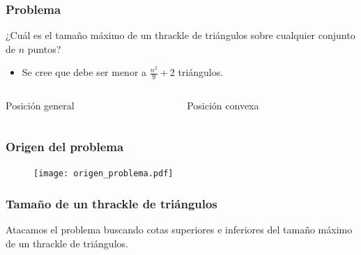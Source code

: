 \documentclass{beamer}
\begin{document}
\begin{frame}
  \frametitle{Problema}
  \begin{block}{}
    ¿Cuál es el tamaño máximo de un thrackle de triángulos sobre
    cualquier conjunto de $n$ puntos?
    \begin{itemize}
      \item Se cree que debe ser menor a $\frac{n^2}{9}+2$ triángulos.
    \end{itemize}
  \end{block}
  \begin{columns}
    \begin{column}{0.5\textwidth}
      \begin{center}
        \begin{figure}[htb]
          \centering
          \def\svgwidth{4.5cm}
          
        \end{figure}
      Posición general
      \end{center}
    \end{column}
    \begin{column}{0.5\textwidth}
      \begin{center}
      \begin{figure}[htb]
        \centering
        \def\svgwidth{4.5cm}
        
      \end{figure}
      Posición convexa
      \end{center}
    \end{column}
  \end{columns}
\end{frame}

\begin{frame}
  \frametitle{Origen del problema}
  \begin{figure}[htb]
    \texttt{[image: origen\_problema.pdf]}
  \end{figure}
\end{frame}

\begin{frame}
  \frametitle{Tamaño de un thrackle de triángulos}
  \begin{block}{}
    Atacamos el problema buscando cotas superiores e inferiores del tamaño
    máximo de un thrackle de triángulos.
  \end{block}
  \begin{figure}[htb]
    \centering
    
  \end{figure}
\end{frame}
\end{document}
